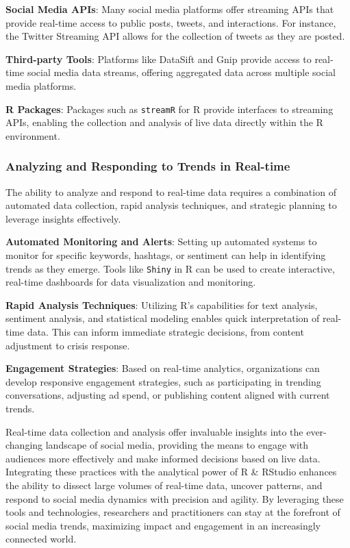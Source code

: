 \documentclass[
]{book}
\begin{document}
\textbf{Social Media APIs}: Many social media platforms offer streaming APIs that provide real-time access to public posts, tweets, and interactions. For instance, the Twitter Streaming API allows for the collection of tweets as they are posted.

\textbf{Third-party Tools}: Platforms like DataSift and Gnip provide access to real-time social media data streams, offering aggregated data across multiple social media platforms.

\textbf{R Packages}: Packages such as \texttt{streamR} for R provide interfaces to streaming APIs, enabling the collection and analysis of live data directly within the R environment.

\hypertarget{analyzing-and-responding-to-trends-in-real-time}{%
\subsubsection*{Analyzing and Responding to Trends in Real-time}\label{analyzing-and-responding-to-trends-in-real-time}}

The ability to analyze and respond to real-time data requires a combination of automated data collection, rapid analysis techniques, and strategic planning to leverage insights effectively.

\textbf{Automated Monitoring and Alerts}: Setting up automated systems to monitor for specific keywords, hashtags, or sentiment can help in identifying trends as they emerge. Tools like \texttt{Shiny} in R can be used to create interactive, real-time dashboards for data visualization and monitoring.

\textbf{Rapid Analysis Techniques}: Utilizing R's capabilities for text analysis, sentiment analysis, and statistical modeling enables quick interpretation of real-time data. This can inform immediate strategic decisions, from content adjustment to crisis response.

\textbf{Engagement Strategies}: Based on real-time analytics, organizations can develop responsive engagement strategies, such as participating in trending conversations, adjusting ad spend, or publishing content aligned with current trends.

Real-time data collection and analysis offer invaluable insights into the ever-changing landscape of social media, providing the means to engage with audiences more effectively and make informed decisions based on live data. Integrating these practices with the analytical power of R \& RStudio enhances the ability to dissect large volumes of real-time data, uncover patterns, and respond to social media dynamics with precision and agility. By leveraging these tools and technologies, researchers and practitioners can stay at the forefront of social media trends, maximizing impact and engagement in an increasingly connected world.
\end{document}
